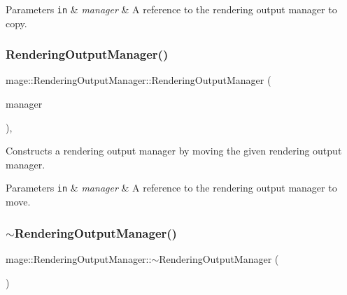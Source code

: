 \begin{DoxyParams}[1]{Parameters}
\mbox{\tt in}  & {\em manager} & A reference to the rendering output manager to copy. \\
\hline
\end{DoxyParams}
\hypertarget{classmage_1_1_rendering_output_manager_a39421535b27a270a759cb1f9d171435f}{}\label{classmage_1_1_rendering_output_manager_a39421535b27a270a759cb1f9d171435f} 
\subsubsection{\texorpdfstring{Rendering\+Output\+Manager()}{RenderingOutputManager()}\hspace{0.1cm}{\footnotesize\ttfamily [3/3]}}
{\footnotesize\ttfamily mage\+::\+Rendering\+Output\+Manager\+::\+Rendering\+Output\+Manager (\begin{DoxyParamCaption}\item[{\hyperlink{classmage_1_1_rendering_output_manager}{Rendering\+Output\+Manager} \&\&}]{manager }\end{DoxyParamCaption})\hspace{0.3cm}{\ttfamily [default]}, {\ttfamily [noexcept]}}

Constructs a rendering output manager by moving the given rendering output manager.


\begin{DoxyParams}[1]{Parameters}
\mbox{\tt in}  & {\em manager} & A reference to the rendering output manager to move. \\
\hline
\end{DoxyParams}
\hypertarget{classmage_1_1_rendering_output_manager_ac6c1b4ce353870ea603982623962b2f4}{}\label{classmage_1_1_rendering_output_manager_ac6c1b4ce353870ea603982623962b2f4} 
\subsubsection{\texorpdfstring{$\sim$\+Rendering\+Output\+Manager()}{~RenderingOutputManager()}}
{\footnotesize\ttfamily mage\+::\+Rendering\+Output\+Manager\+::$\sim$\+Rendering\+Output\+Manager (\begin{DoxyParamCaption}{ }\end{DoxyParamCaption})\hspace{0.3cm}{\ttfamily [default]}}

